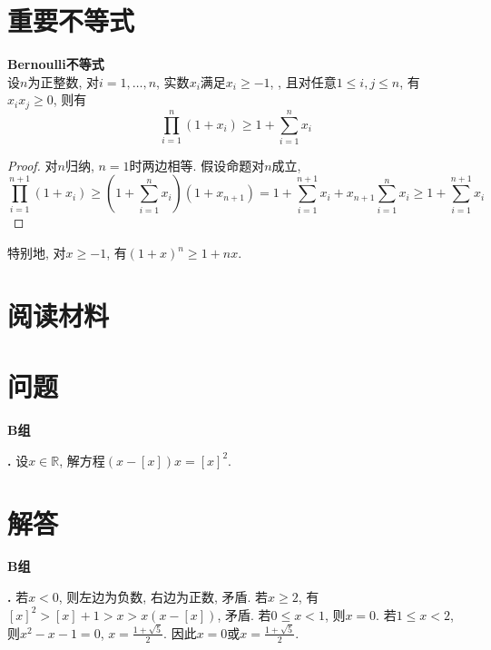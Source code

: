 

\section{重要不等式}

\begin{thm}\textbf{Bernoulli不等式}\\
设$n$为正整数, 对$i=1,\dots,n$, 实数$x_i$满足$x_i\ge -1$, , 且对任意$1\le i,j \le n$, 有$x_ix_j\ge 0$, 则有 
\begin{equation}
    \prod_{i=1}^n (1+x_i)\ge 1+\sum_{i=1}^n x_i
\end{equation}
\end{thm}
\begin{proof}
对$n$归纳, $n=1$时两边相等. 假设命题对$n$成立, 
\begin{equation*}
    \prod_{i=1}^{n+1} (1+x_i)\ge (1+\sum_{i=1}^n x_i)(1+x_{n+1})=1+\sum_{i=1}^{n+1} x_i+x_{n+1}\sum_{i=1}^{n} x_i\ge 1+\sum_{i=1}^{n+1} x_i
\end{equation*}
\end{proof}
特别地, 对$x\ge -1$, 有$(1+x)^n\ge 1+nx$. 

\section*{阅读材料}

\section*{问题}
\par \textbf{B组}
\par \textbf{\theprobineq .} \cite{SMI} 设$x\in \mathbb{R}$, 解方程$(x-[x])x=[x]^2$. 


\section*{解答}
\par \textbf{B组}
\par \textbf{\thesolineq .} 若$x<0$, 则左边为负数, 右边为正数, 矛盾. 若$x\ge 2$,  有$[x]^2>[x]+1>x>x(x-[x])$, 矛盾. 若$0\le x<1$, 则$x=0$. 若$1\le x<2$, 则$x^2-x-1=0$, $x=\frac{1+\sqrt{5}}{2}$. 因此$x=0$或$x=\frac{1+\sqrt{5}}{2}$. 